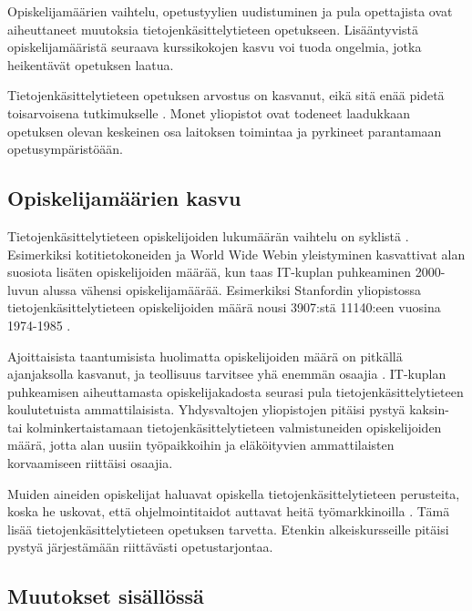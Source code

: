\documentclass[finnish]{tktltiki2}
\theoremstyle{definition}
\theoremstyle{remark}
\begin{document}
Opiskelijamäärien vaihtelu, opetustyylien uudistuminen ja pula opettajista ovat aiheuttaneet muutoksia tie\-to\-jen\-kä\-sit\-te\-ly\-tie\-teen opetukseen. Lisääntyvistä opiskelijamääristä seuraava kurssikokojen kasvu voi tuoda ongelmia, jotka heikentävät opetuksen laatua.  \par

Tie\-to\-jen\-kä\-sit\-te\-ly\-tie\-teen opetuksen arvostus on kasvanut, eikä sitä enää pidetä toisarvoisena tutkimukselle \cite{Biggs07}. Monet yliopistot ovat todeneet laadukkaan opetuksen olevan keskeinen osa laitoksen toimintaa ja pyrkineet parantamaan opetusympäristöään. \par


\subsection{Opiskelijamäärien kasvu}
Tietojenkäsittelytieteen opiskelijoiden lukumäärän vaihtelu on syklistä \cite{Roberts11}. Esimerkiksi kotitietokoneiden ja World Wide Webin yleistyminen kasvattivat alan suosiota lisäten opiskelijoiden määrää, kun taas IT-kuplan puhkeaminen 2000-luvun alussa vähensi opiskelijamäärää. Esimerkiksi Stanfordin yliopistossa tietojenkäsittelytieteen opiskelijoiden määrä nousi 3907:stä 11140:een vuosina 1974-1985 \cite{Reges88}.  \par

Ajoittaisista taantumisista huolimatta opiskelijoiden määrä on pitkällä ajanjaksolla kasvanut, ja teollisuus tarvitsee yhä enemmän osaajia \cite{Roberts11}. IT-kuplan puhkeamisen aiheuttamasta opiskelijakadosta seurasi pula tie\-to\-jen\-kä\-sit\-te\-ly\-tie\-teen koulutetuista ammattilaisista. Yhdysvaltojen yliopistojen pitäisi pystyä kaksin- tai kolminkertaistamaan tie\-to\-jen\-kä\-sit\-te\-ly\-tie\-teen valmistuneiden opiskelijoiden määrä, jotta alan uusiin työpaikkoihin ja eläköityvien ammattilaisten korvaamiseen riittäisi osaajia.  \par

Muiden aineiden opiskelijat haluavat opiskella tietojenkäsittelytieteen perusteita, koska he uskovat, että ohjelmointitaidot auttavat heitä työmarkkinoilla \cite{Roberts11}. Tämä lisää tietojenkäsittelytieteen opetuksen tarvetta. Etenkin alkeiskursseille pitäisi pystyä järjestämään riittävästi opetustarjontaa.  \par



\subsection{Muutokset sisällössä}
\end{document}
